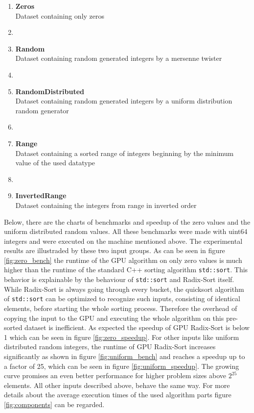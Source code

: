 \documentclass{llncs}
\begin{document}
\begin{enumerate}
  \item \textbf{Zeros}\\ Dataset containing only zeros
  \item[]
  \item \textbf{Random}\\ Dataset containing random generated integers by a mersenne twister
  \item[]
  \item \textbf{RandomDistributed}\\  Dataset containing random generated integers by a uniform distribution random generator
  \item[]
  \item \textbf{Range}\\ Dataset containing a sorted range of integers beginning by the minimum value of the used datatype
  \item[]
  \item \textbf{InvertedRange}\\ Dataset containing the integers from range in inverted order
\end{enumerate}

Below, there are the charts of benchmarks and speedup of the zero values and the uniform distributed random values. All these benchmarks were made with uint64 integers and were executed on the machine mentioned above. The experimental results are illustraded by these two input groups. As can be seen in figure \ref{fig:zero_bench} the runtime of the GPU algorithm on only zero values is much higher than the runtime of the standard C++ sorting algorithm \texttt{std::sort}. This behavior is explainable by the behaviour of \texttt{std::sort} and Radix-Sort itself. While Radix-Sort is always going through every bucket, the quicksort algorithm of \texttt{std::sort} can be optimized to recognize such inputs, consisting of identical elements, before starting the whole sorting process. Therefore the overhead of copying the input to the GPU and executing the whole algorithm on this pre-sorted dataset is inefficient. As expected the speedup of GPU Radix-Sort is below 1 which can be seen in figure \ref{fig:zero_speedup}. For other inputs like uniform distributed random integers, the runtime of GPU Radix-Sort increases significantly as shown in figure \ref{fig:uniform_bench} and reaches a speedup up to a factor of 25, which can be seen in figure \ref{fig:uniform_speedup}. The growing curve promises an even better performance for higher problem sizes above $2^{25}$ elements. All other inputs described above, behave the same way. For more details about the average execution times of the used algorithm parts figure \ref{fig:components} can be regarded.
\end{document}
